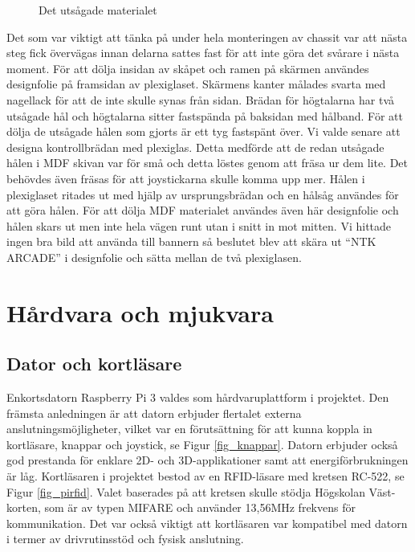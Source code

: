 \documentclass[12pt,fleqn,openany]{book} %
\begin{document}
\begin{wrapfigure}[17]{R}{0.35\textwidth}
  \begin{center}
  \end{center}
  \caption{Det utsågade materialet}
  \label{fig_material}
\end{wrapfigure}
\newpage
Det som var viktigt att tänka på under hela monteringen av chassit var att nästa steg fick övervägas innan delarna sattes fast 
för att inte göra det svårare i nästa moment. För att dölja insidan av skåpet och ramen på skärmen användes designfolie på framsidan 
av plexiglaset. Skärmens kanter målades svarta med nagellack för att de inte skulle synas från sidan. Brädan för högtalarna har två
utsågade hål och högtalarna sitter fastspända på baksidan med hålband. För att dölja de utsågade hålen som gjorts är ett tyg fastspänt
över. Vi valde senare att designa kontrollbrädan med plexiglas. Detta medförde att de redan utsågade hålen i MDF skivan var för små 
och detta löstes genom att fräsa ur dem lite. Det behövdes även fräsas för att joystickarna skulle komma upp mer. Hålen i plexiglaset
ritades ut med hjälp av ursprungsbrädan och en hålsåg användes för att göra hålen. För att dölja MDF materialet användes även här 
designfolie och hålen skars ut men inte hela vägen runt utan i snitt in mot mitten. Vi hittade ingen bra bild att använda till bannern 
så beslutet blev att skära ut “NTK ARCADE” i designfolie och sätta mellan de två plexiglasen.

\section{Hårdvara och mjukvara}
\subsection{Dator och kortläsare}
Enkortsdatorn Raspberry Pi 3 valdes som hårdvaruplattform i projektet. Den främsta anledningen är att datorn erbjuder flertalet
externa anslutningsmöjligheter, vilket var en förutsättning för att kunna koppla in kortläsare, knappar och joystick, se Figur \ref{fig_knappar}. Datorn 
erbjuder också god prestanda för enklare 2D- och 3D-applikationer samt att energiförbrukningen är låg. Kortläsaren i projektet 
bestod av en RFID-läsare med kretsen RC-522, se Figur \ref{fig_pirfid}. Valet baserades på att kretsen skulle stödja Högskolan Väst-korten, som är av typen 
MIFARE och använder 13,56MHz frekvens för kommunikation. Det var också viktigt att kortläsaren var kompatibel med datorn i termer 
av drivrutinsstöd och fysisk anslutning.
\end{document}
